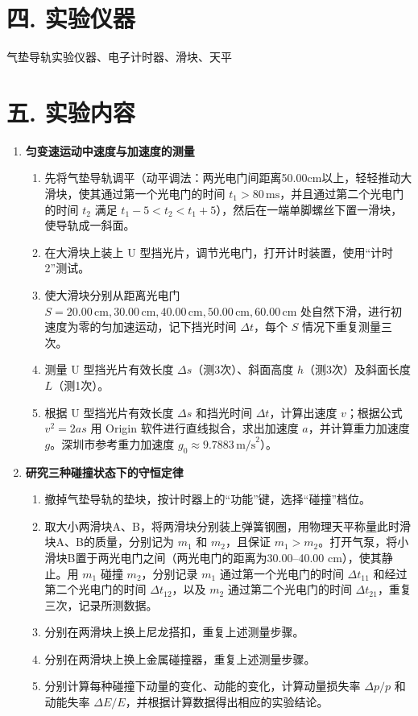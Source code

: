 \documentclass[12pt,a4paper]{article}
\begin{document}
	\section*{\textbf{{四. 实验仪器}}}
	气垫导轨实验仪器、电子计时器、滑块、天平

	\section*{\textbf{{五. 实验内容}}}

	\begin{enumerate}
		\item \textbf{匀变速运动中速度与加速度的测量}
		
			\begin{enumerate}
				\item 先将气垫导轨调平（动平调法：两光电门间距离50.00cm以上，轻轻推动大滑块，使其通过第一个光电门的时间 $t_1 > 80\,\text{ms}$，并且通过第二个光电门的时间 $t_2$ 满足 $t_1 - 5 < t_2 < t_1 + 5$），然后在一端单脚螺丝下置一滑块，使导轨成一斜面。
				\item 在大滑块上装上 U 型挡光片，调节光电门，打开计时装置，使用“计时2”测试。
				\item 使大滑块分别从距离光电门 $S = 20.00\,\text{cm}, 30.00\,\text{cm}, 40.00\,\text{cm}, 50.00\,\text{cm}, 60.00\,\text{cm}$ 处自然下滑，进行初速度为零的匀加速运动，记下挡光时间 $\Delta t$，每个 $S$ 情况下重复测量三次。
				\item 测量 U 型挡光片有效长度 $\Delta s$（测3次）、斜面高度 $h$（测3次）及斜面长度 $L$（测1次）。
				\item 根据 U 型挡光片有效长度 $\Delta s$ 和挡光时间 $\Delta t$，计算出速度 $v$；根据公式 $v^2 = 2as$ 用 Origin 软件进行直线拟合，求出加速度 $a$，并计算重力加速度 $g$。深圳市参考重力加速度 $g_0 \approx 9.7883\,\text{m/s}^2$）。
			\end{enumerate}
		\item \textbf{研究三种碰撞状态下的守恒定律}	
			\begin{enumerate}
				\item 撤掉气垫导轨的垫块，按计时器上的“功能”键，选择“碰撞”档位。
				\item 取大小两滑块A、B，将两滑块分别装上弹簧钢圈，用物理天平称量此时滑块A、B的质量，分别记为 $m_1$ 和 $m_2$，且保证 $m_1 > m_2$。打开气泵，将小滑块B置于两光电门之间（两光电门的距离为30.00--40.00 cm），使其静止。用 $m_1$ 碰撞 $m_2$，分别记录 $m_1$ 通过第一个光电门的时间 $\Delta t_{11}$ 和经过第二个光电门的时间 $\Delta t_{12}$，以及 $m_2$ 通过第二个光电门的时间 $\Delta t_{21}$，重复三次，记录所测数据。
				\item 分别在两滑块上换上尼龙搭扣，重复上述测量步骤。
				\item 分别在两滑块上换上金属碰撞器，重复上述测量步骤。
				\item 分别计算每种碰撞下动量的变化、动能的变化，计算动量损失率 $\Delta p/p$ 和动能失率 $\Delta E/E$，并根据计算数据得出相应的实验结论。
			\end{enumerate}

	\end{enumerate}
	
\end{document}
